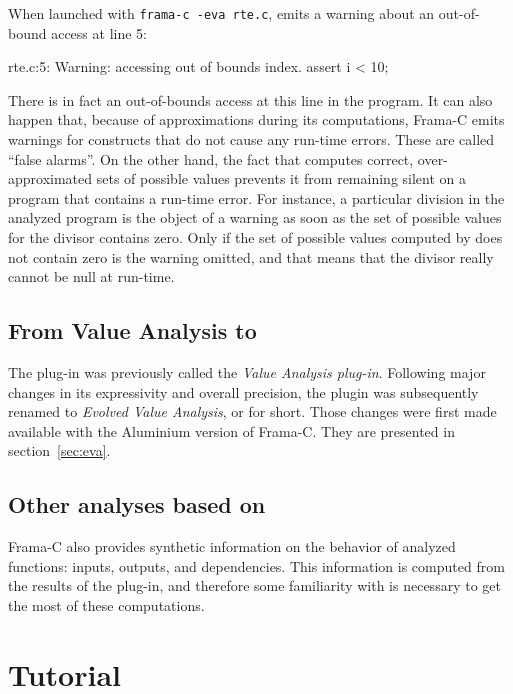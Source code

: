 \documentclass{frama-c-book}
\begin{document}

When launched with \lstinline|frama-c -eva rte.c|,
\Eva{} emits a warning about an out-of-bound access at line 5:
\begin{logs}
 rte.c:5: Warning: accessing out of bounds index. assert i < 10;
\end{logs}
There is in fact an out-of-bounds access at this line in the program.
It can also happen that, because of approximations during its computations,
Frama-C emits warnings for constructs
that do not cause any run-time errors. These are called ``false alarms''.
On the other hand, the fact that \Eva{}
computes correct, over-approximated sets of possible values prevents it
from remaining silent on a program that contains a run-time error. For
instance, a particular division in the analyzed program
is the object of a warning
as soon as the set of possible values for the divisor
contains zero. Only
if the set of possible values computed by \Eva{}
does not contain zero is the warning omitted, and
that means that the divisor really cannot be null at run-time.

\section{From Value Analysis to \Eva{}}

The \Eva{} plug-in was previously called the \emph{Value Analysis plug-in}.
Following major changes in its expressivity and overall precision,
the plugin was subsequently renamed to \emph{Evolved Value Analysis}, or
\Eva{} for short. Those changes were first made available with the
Aluminium version of Frama-C. They are presented in section~\ref{sec:eva}.

\section{Other analyses based on \Eva{}}

Frama-C also provides
synthetic information on the behavior of analyzed functions:
inputs, outputs, and dependencies. This information is computed
from the results of the \Eva{} plug-in,
and therefore some familiarity with \Eva{}
is necessary to get the most of these computations.

\chapter{Tutorial}\label{tutorial}
\vspace{2cm}
\end{document}

